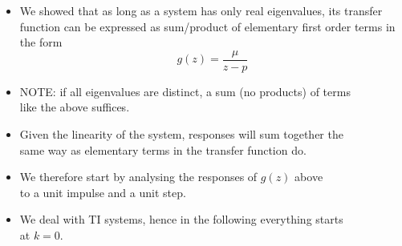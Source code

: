 \begin{frame}
\myPause
 \begin{itemize}[<+-| alert@+>]
 \item We showed that as long as a system has only real eigenvalues, its transfer function can be
       expressed as sum/product of elementary first order terms in the form
       \begin{displaymath}
        g(z) = \frac{\mu}{z-p}
       \end{displaymath}
 \item NOTE: if all eigenvalues are distinct, a sum (no products) of terms\\
       like the above suffices.
 \item Given the linearity of the system, responses will sum together the\\
       same way as elementary terms in the transfer function do.
 \item We therefore start by analysing the responses of $g(z)$ above\\
       to a unit impulse and a unit step.
 \item We deal with TI systems, hence in the following everything starts\\
       at $k=0$.
 \end{itemize}
\end{frame}

